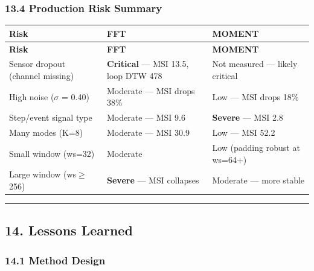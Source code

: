 \documentclass[11pt,a4paper]{article}
\begin{document}
\subsubsection{13.4 Production Risk Summary}

\begin{longtable}{|l|l|l|}
\hline
\textbf{Risk} & \textbf{FFT} & \textbf{MOMENT} \\
\hline
\endfirsthead
\hline
\textbf{Risk} & \textbf{FFT} & \textbf{MOMENT} \\
\hline
\endhead
\hline
\endfoot
Sensor dropout (channel missing) & \textbf{Critical} --- MSI 13.5, loop DTW 478 & Not measured --- likely critical \\
\hline
High noise ($\sigma$ = 0.40) & Moderate --- MSI drops 38\% & Low --- MSI drops 18\% \\
\hline
Step/event signal type & Moderate --- MSI 9.6 & \textbf{Severe} --- MSI 2.8 \\
\hline
Many modes (K=8) & Moderate --- MSI 30.9 & Low --- MSI 52.2 \\
\hline
Small window (ws=32) & Moderate & Low (padding robust at ws=64+) \\
\hline
Large window (ws$\geq$256) & \textbf{Severe} --- MSI collapses & Moderate --- more stable \\
\hline
\end{longtable}

\vspace{4pt}\hrule\vspace{4pt}

\subsection{14. Lessons Learned}

\subsubsection{14.1 Method Design}
\end{document}
